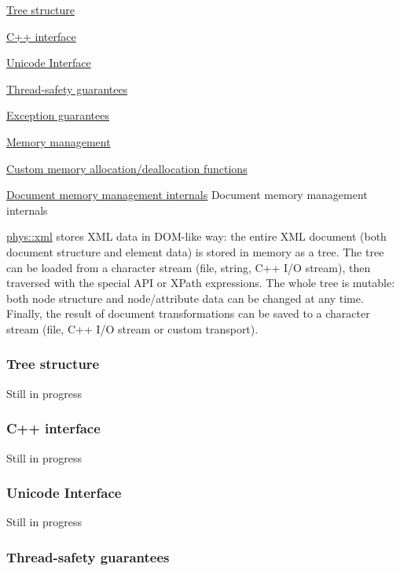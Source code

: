 \begin{DoxyItemize}
\item \hyperlink{XMLManual_XMLTreeStructure}{Tree structure}
\item \hyperlink{XMLManual_XMLInterface}{C++ interface}
\item \hyperlink{XMLManual_XMLUnicode}{Unicode Interface}
\item \hyperlink{XMLManual_XMLThreadSafety}{Thread-\/safety guarantees}
\item \hyperlink{XMLManual_XMLExceptionSafety}{Exception guarantees}
\item \hyperlink{XMLManual_XMLMemory}{Memory management}
\begin{DoxyItemize}
\item \hyperlink{XMLManual_XMLCustomAlloc}{Custom memory allocation/deallocation functions}
\item \hyperlink{XMLManual_XMLMemoryInternals}{Document memory management internals} Document memory management internals \par
 \hyperlink{namespacephys_1_1xml}{phys::xml} stores XML data in DOM-\/like way: the entire XML document (both document structure and element data) is stored in memory as a tree. The tree can be loaded from a character stream (file, string, C++ I/O stream), then traversed with the special API or XPath expressions. The whole tree is mutable: both node structure and node/attribute data can be changed at any time. Finally, the result of document transformations can be saved to a character stream (file, C++ I/O stream or custom transport). 
\end{DoxyItemize}
\end{DoxyItemize}\hypertarget{XMLManual_XMLTreeStructure}{}\subsubsection{Tree structure}\label{XMLManual_XMLTreeStructure}
Still in progress \hypertarget{XMLManual_XMLInterface}{}\subsubsection{C++ interface}\label{XMLManual_XMLInterface}
Still in progress \hypertarget{XMLManual_XMLUnicode}{}\subsubsection{Unicode Interface}\label{XMLManual_XMLUnicode}
Still in progress \hypertarget{XMLManual_XMLThreadSafety}{}\subsubsection{Thread-\/safety guarantees}\label{XMLManual_XMLThreadSafety}
